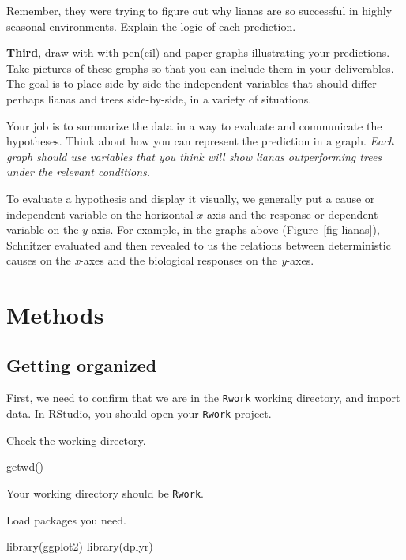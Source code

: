 \documentclass[
  letterpaper,
  DIV=11,
  numbers=noendperiod]{scrreprt}
\newenvironment{Shaded}{\begin{snugshade}}{\end{snugshade}}
\newcommand{\FunctionTok}[1]{\textcolor[rgb]{0.28,0.35,0.67}{#1}}
\newcommand{\NormalTok}[1]{\textcolor[rgb]{0.00,0.23,0.31}{#1}}
\begin{document}
Remember, they were trying to figure out why lianas are so successful in
highly seasonal environments. Explain the logic of each prediction.

\textbf{Third}, draw with with pen(cil) and paper graphs illustrating
your predictions. Take pictures of these graphs so that you can include
them in your deliverables. The goal is to place side-by-side the
independent variables that should differ - perhaps lianas and trees
side-by-side, in a variety of situations.

Your job is to summarize the data in a way to evaluate and communicate
the hypotheses. Think about how you can represent the prediction in a
graph. \emph{Each graph should use variables that you think will show
lianas outperforming trees under the relevant conditions.}

To evaluate a hypothesis and display it visually, we generally put a
cause or independent variable on the horizontal \(x\)-axis and the
response or dependent variable on the \(y\)-axis. For example, in the
graphs above (Figure~\ref{fig-lianas}), Schnitzer evaluated and then
revealed to us the relations between deterministic causes on the
\emph{x}-axes and the biological responses on the \emph{y}-axes.

\section{Methods}\label{methods-1}

\subsection{Getting organized}\label{getting-organized}

First, we need to confirm that we are in the \texttt{Rwork} working
directory, and import data. In RStudio, you should open your
\texttt{Rwork} project.

Check the working directory.

\begin{Shaded}
\begin{Highlighting}[]
\FunctionTok{getwd}\NormalTok{()}
\end{Highlighting}
\end{Shaded}

Your working directory should be \texttt{Rwork}.

Load packages you need.

\begin{Shaded}
\begin{Highlighting}[]
\FunctionTok{library}\NormalTok{(ggplot2)}
\FunctionTok{library}\NormalTok{(dplyr)}
\end{Highlighting}
\end{Shaded}
\end{document}

